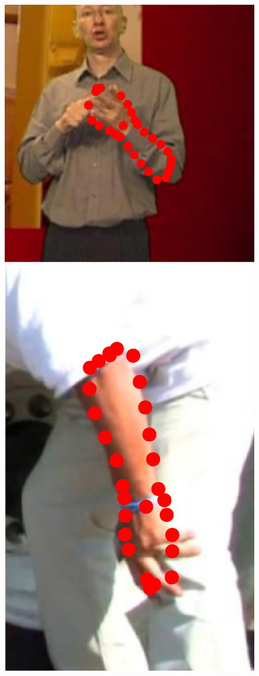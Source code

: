 \begin{figure}[!t]
    \includegraphics[height=\ofh]{resources/Suplementory_Meterial/ExFit/0011.eps}
    \hfill
    \includegraphics[height=\ofh]{resources/Suplementory_Meterial/ExFit/0012.eps}

\end{figure}
